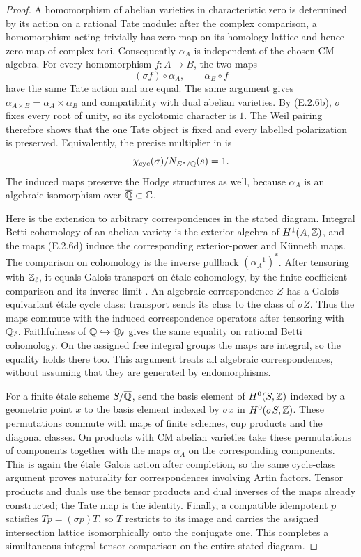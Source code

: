 \begin{proof}
A homomorphism of abelian varieties in characteristic zero is determined by its action on a rational Tate module: after the complex comparison, a homomorphism acting trivially has zero map on its homology lattice and hence zero map of complex tori. Consequently $\alpha_A$ is independent of the chosen CM algebra. For every homomorphism $f:A\to B$, the two maps
\[
 (\sigma f)\circ\alpha_A,\qquad \alpha_B\circ f
 \tag{E.2.6e}
\]
have the same Tate action and are equal. The same argument gives $\alpha_{A\times B}=\alpha_A\times\alpha_B$ and compatibility with dual abelian varieties. By (E.2.6b), $\sigma$ fixes every root of unity, so its cyclotomic character is $1$. The Weil pairing therefore shows that the one Tate object is fixed and every labelled polarization is preserved. Equivalently, the precise multiplier in \cite[Remark 9.11(c), p.~78]{GenMilneCM2020} is
\[
 \chi_{\mathrm{cyc}}(\sigma)/N_{E^*/\mathbb Q}(s)=1.
\]
The induced maps preserve the Hodge structures as well, because $\alpha_A$ is an algebraic isomorphism over $\overline{\mathbb Q}\subset\mathbb C$.

Here is the extension to arbitrary correspondences in the stated diagram. Integral Betti cohomology of an abelian variety is the exterior algebra of $H^1(A,\mathbb Z)$, and the maps (E.2.6d) induce the corresponding exterior-power and K\"unneth maps. The comparison on cohomology is the inverse pullback $(\alpha_A^{-1})^*$. After tensoring with $\mathbb Z_\ell$, it equals Galois transport on \'etale cohomology, by the finite-coefficient comparison and its inverse limit \cite[Expos\'e XVI, Th\'eor\`eme 4.1]{GenSGA4}. An algebraic correspondence $Z$ has a Galois-equivariant \'etale cycle class: transport sends its class to the class of $\sigma Z$. Thus the maps commute with the induced correspondence operators after tensoring with $\mathbb Q_\ell$. Faithfulness of $\mathbb Q\hookrightarrow\mathbb Q_\ell$ gives the same equality on rational Betti cohomology. On the assigned free integral groups the maps are integral, so the equality holds there too. This argument treats all algebraic correspondences, without assuming that they are generated by endomorphisms.

For a finite \'etale scheme $S/\overline{\mathbb Q}$, send the basis element of $H^0(S,\mathbb Z)$ indexed by a geometric point $x$ to the basis element indexed by $\sigma x$ in $H^0(\sigma S,\mathbb Z)$. These permutations commute with maps of finite schemes, cup products and the diagonal classes. On products with CM abelian varieties take these permutations of components together with the maps $\alpha_A$ on the corresponding components. This is again the \'etale Galois action after completion, so the same cycle-class argument proves naturality for correspondences involving Artin factors. Tensor products and duals use the tensor products and dual inverses of the maps already constructed; the Tate map is the identity. Finally, a compatible idempotent $p$ satisfies $T p=(\sigma p)T$, so $T$ restricts to its image and carries the assigned intersection lattice isomorphically onto the conjugate one. This completes a simultaneous integral tensor comparison on the entire stated diagram.


\end{proof}
